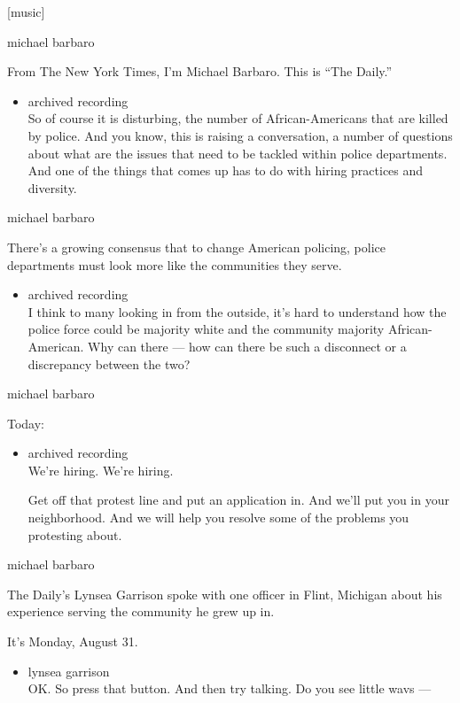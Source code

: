 {[}music{]}

michael barbaro

From The New York Times, I'm Michael Barbaro. This is ``The Daily.''

\begin{itemize}
\tightlist
\item
  archived recording\\
  So of course it is disturbing, the number of African-Americans that
  are killed by police. And you know, this is raising a conversation, a
  number of questions about what are the issues that need to be tackled
  within police departments. And one of the things that comes up has to
  do with hiring practices and diversity.
\end{itemize}

michael barbaro

There's a growing consensus that to change American policing, police
departments must look more like the communities they serve.

\begin{itemize}
\tightlist
\item
  archived recording\\
  I think to many looking in from the outside, it's hard to understand
  how the police force could be majority white and the community
  majority African-American. Why can there --- how can there be such a
  disconnect or a discrepancy between the two?
\end{itemize}

michael barbaro

Today:

\begin{itemize}
\item
  archived recording\\
  We're hiring. We're hiring.

  Get off that protest line and put an application in. And we'll put you
  in your neighborhood. And we will help you resolve some of the
  problems you protesting about.
\end{itemize}

michael barbaro

The Daily's Lynsea Garrison spoke with one officer in Flint, Michigan
about his experience serving the community he grew up in.

It's Monday, August 31.

\begin{itemize}
\tightlist
\item
  lynsea garrison\\
  OK. So press that button. And then try talking. Do you see little wavs
  ---
\end{itemize}


